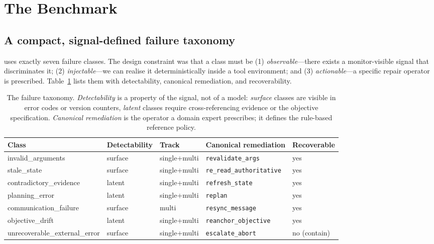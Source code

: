 \section{The \arb{} Benchmark}\label{sec:bench}

\subsection{A compact, signal-defined failure taxonomy}

\arb{} uses exactly seven failure classes. The design constraint was that a class must be
(1) \emph{observable}---there exists a monitor-visible signal that discriminates it; (2)
\emph{injectable}---we can realise it deterministically inside a tool environment; and (3)
\emph{actionable}---a specific repair operator is prescribed. Table~\ref{tab:taxonomy} lists them
with detectability, canonical remediation, and recoverability.

\begin{table}[t]
\centering
\small
\caption{The \arb{} failure taxonomy. \emph{Detectability} is a property of the signal, not of a
model: \emph{surface} classes are visible in error codes or version counters, \emph{latent} classes
require cross-referencing evidence or the objective specification. \emph{Canonical remediation} is
the operator a domain expert prescribes; it defines the rule-based reference policy.}
\label{tab:taxonomy}
\begin{adjustbox}{max width=\textwidth}
\begin{tabular}{@{}lllll@{}}
\toprule
Class & Detectability & Track & Canonical remediation & Recoverable \\
\midrule
invalid\_arguments & surface & single+multi & \texttt{revalidate\_args} & yes \\
stale\_state & surface & single+multi & \texttt{re\_read\_authoritative} & yes \\
contradictory\_evidence & latent & single+multi & \texttt{refresh\_state} & yes \\
planning\_error & latent & single+multi & \texttt{replan} & yes \\
communication\_failure & surface & multi & \texttt{resync\_message} & yes \\
objective\_drift & latent & single+multi & \texttt{reanchor\_objective} & yes \\
unrecoverable\_external\_error & surface & single+multi & \texttt{escalate\_abort} & no (contain) \\
\bottomrule
\end{tabular}
\end{adjustbox}
\end{table}

